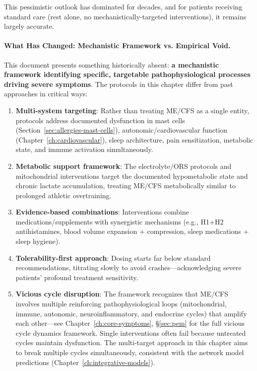 This pessimistic outlook has dominated for decades, and for patients receiving standard care (rest alone, no mechanistically-targeted interventions), it remains largely accurate.

\paragraph{What Has Changed: Mechanistic Framework vs. Empirical Void.}

This document presents something historically absent: \textbf{a mechanistic framework identifying specific, targetable pathophysiological processes driving severe symptoms}. The protocols in this chapter differ from past approaches in critical ways:

\begin{enumerate}
    \item \textbf{Multi-system targeting}: Rather than treating ME/CFS as a single entity, protocols address documented dysfunction in mast cells (Section~\ref{sec:allergies-mast-cells}), autonomic/cardiovascular function (Chapter~\ref{ch:cardiovascular}), sleep architecture, pain sensitization, metabolic state, and immune activation simultaneously.

    \item \textbf{Metabolic support framework}: The electrolyte/ORS protocols and mitochondrial interventions target the documented hypometabolic state and chronic lactate accumulation, treating ME/CFS metabolically similar to prolonged athletic overtraining.

    \item \textbf{Evidence-based combinations}: Interventions combine medications/supplements with synergistic mechanisms (e.g., H1+H2 antihistamines, blood volume expansion + compression, sleep medications + sleep hygiene).

    \item \textbf{Tolerability-first approach}: Dosing starts far below standard recommendations, titrating slowly to avoid crashes—acknowledging severe patients' profound treatment sensitivity.

    \item \textbf{Vicious cycle disruption}: The framework recognizes that ME/CFS involves multiple reinforcing pathophysiological loops (mitochondrial, immune, autonomic, neuroinflammatory, and endocrine cycles) that amplify each other---see Chapter~\ref{ch:core-symptoms}, \S\ref{sec:pem} for the full vicious cycle dynamics framework. Single interventions often fail because untreated cycles maintain dysfunction. The multi-target approach in this chapter aims to break multiple cycles simultaneously, consistent with the network model predictions (Chapter~\ref{ch:integrative-models}).
\end{enumerate}


